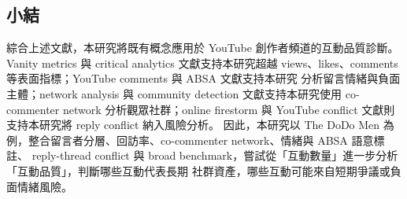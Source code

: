 \subsection{小結}

綜合上述文獻，本研究將既有概念應用於 YouTube 創作者頻道的互動品質診斷。Vanity metrics 與 critical
analytics 文獻支持本研究超越 views、likes、comments 等表面指標；YouTube comments 與 ABSA 文獻支持本研究
分析留言情緒與負面主體；network analysis 與 community detection 文獻支持本研究使用 co-commenter network
分析觀眾社群；online firestorm 與 YouTube conflict 文獻則支持本研究將 reply conflict 納入風險分析。
因此，本研究以 The DoDo Men 為例，整合留言者分層、回訪率、co-commenter network、情緒與 ABSA 語意標註、
reply-thread conflict 與 broad benchmark，嘗試從「互動數量」進一步分析「互動品質」，判斷哪些互動代表長期
社群資產，哪些互動可能來自短期爭議或負面情緒風險。
